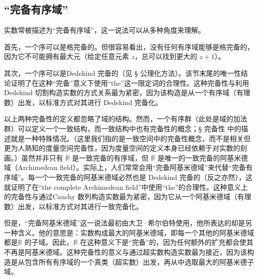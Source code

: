 \subsection{“完备有序域”}
实数常被描述为“完备有序域”，这一说法可以从多种角度来理解。

首先，一个序可以是格完备的。但很容易看出，没有任何有序域能够是格完备的，因为它不可能拥有最大元（给定任意元素 $z$，总可以找到更大的 $z+1$）。

其次，一个序可以是Dedekind 完备的（见 § 公理化方法）。该节末尾的唯一性结论证明了在这种“完备”意义下使用“the”这一限定词的合理性。这种完备性与利用 Dedekind 切割构造实数的方式关系最为紧密，因为该构造是从一个有序域（有理数）出发，以标准方式对其进行 Dedekind 完备化。

以上两种完备性的定义都忽略了域的结构。然而，一个有序群（此处是域的加法群）可以定义一个一致结构，而一致结构中也有完备性的概念；§ 完备性 中的描述就是一种特殊情况。（这里我们指的是一致空间中的完备性概念，而不是相关但更为人熟知的度量空间完备性，因为度量空间的定义本身已经依赖于对实数的刻画。）虽然并非只有 $\mathbb{R}$ 是一致完备的有序域，但 $\mathbb{R}$ 是唯一的一致完备的阿基米德域（Archimedean field）。实际上，人们常常会用“完备阿基米德域”来代替“完备有序域”。每一个一致完备的阿基米德域必然也是 Dedekind 完备的（反之亦然），这就证明了在“the complete Archimedean field”中使用“the”的合理性。这种意义上的完备性与通过Cauchy 数列构造实数最为紧密，因为它从一个阿基米德域（有理数）出发，以标准方式对其进行一致完备化。

但是，“完备阿基米德域”这一说法最初由大卫·希尔伯特使用，他所表达的却是另一种含义。他的意思是：实数构成最大的阿基米德域，即每一个其他的阿基米德域都是$\mathbb{R}$ 的子域。因此，$\mathbb{R}$ 在这种意义下是“完备”的，因为任何额外的扩充都会使其不再是阿基米德域。这种完备性的意义与通过超实数构造实数最为接近，因为该构造是从包含所有有序域的一个真类（超实数）出发，再从中选取最大的阿基米德子域。
